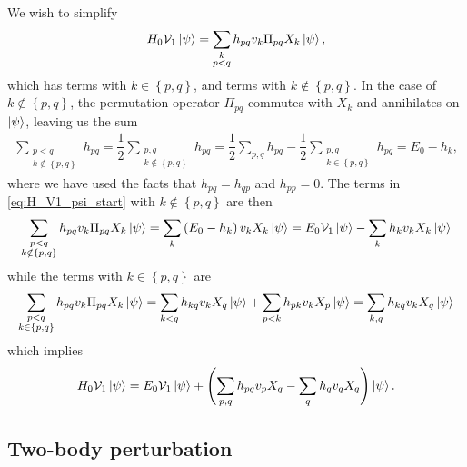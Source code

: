 \documentclass[nofootinbib,notitlepage,11pt]{revtex4-2}
\newcommand{\f}[2]{\dfrac{#1}{#2}} %
\newcommand{\p}[1]{\left(#1\right)} %
\renewcommand{\set}[1]{\left\{#1\right\}} %
\newcommand{\1}{\mathds{1}}
\newcommand{\V}{\mathcal{V}}
\begin{document}
We wish to simplify
\begin{align}
  H_0 \V_1 \ket\psi
  = \sum_{\substack{k\\p<q}} h_{pq} v_k \Pi_{pq} X_k \ket\psi,
  \label{eq:H_V1_psi_start}
\end{align}
which has terms with $k\in\set{p,q}$, and terms with
$k\notin\set{p,q}$.  In the case of $k\notin\set{p,q}$, the
permutation operator $\Pi_{pq}$ commutes with $X_k$ and annihilates on
$\ket\psi$, leaving us the sum
\begin{align}
  \sum_{\substack{p<q\\k\notin\set{p,q}}} h_{pq}
  = \f12 \sum_{\substack{p,q\\k\notin\set{p,q}}} h_{pq}
  = \f12 \sum_{p,q} h_{pq}
  - \f12 \sum_{\substack{p,q\\k\in\set{p,q}}} h_{pq}
  = E_0 - h_k,
\end{align}
where we have used the facts that $h_{pq}=h_{qp}$ and $h_{pp}=0$.  The
terms in \eqref{eq:H_V1_psi_start} with $k\notin\set{p,q}$ are then
\begin{align}
  \sum_{\substack{p<q\\k\notin\set{p,q}}}
  h_{pq} v_k \Pi_{pq} X_k \ket\psi
  = \sum_k \p{E_0 - h_k} v_k X_k \ket\psi
  = E_0 \V_1 \ket\psi - \sum_k h_k v_k X_k \ket\psi
\end{align}
while the terms with $k\in\set{p,q}$ are
\begin{align}
  \sum_{\substack{p<q\\k\in\set{p,q}}}
  h_{pq} v_k \Pi_{pq} X_k \ket\psi
  = \sum_{k<q} h_{kq} v_k X_q \ket\psi
  + \sum_{p<k} h_{pk} v_k X_p \ket\psi
  = \sum_{k,q} h_{kq} v_k X_q \ket\psi
\end{align}
which implies
\begin{align}
  H_0 \V_1 \ket\psi
  = E_0 \V_1 \ket\psi
  + \p{\sum_{p,q} h_{pq} v_p X_q - \sum_q h_q v_q X_q} \ket\psi.
\end{align}

\subsection{Two-body perturbation}
\label{sec:H_V2_psi}
\end{document}
